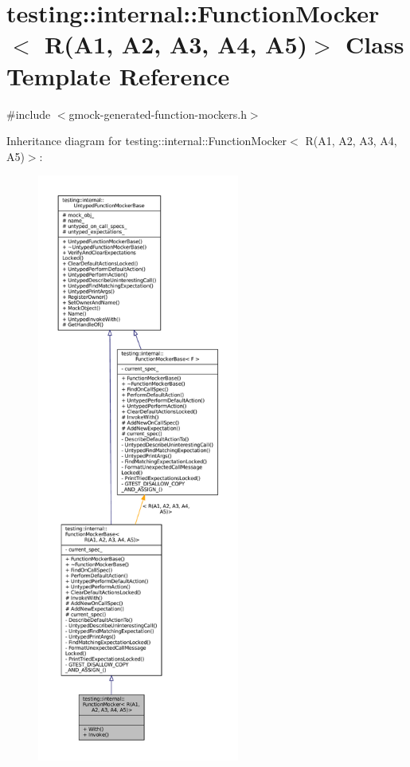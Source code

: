 \hypertarget{classtesting_1_1internal_1_1FunctionMocker_3_01R_07A1_00_01A2_00_01A3_00_01A4_00_01A5_08_4}{}\section{testing\+:\+:internal\+:\+:Function\+Mocker$<$ R(A1, A2, A3, A4, A5)$>$ Class Template Reference}
\label{classtesting_1_1internal_1_1FunctionMocker_3_01R_07A1_00_01A2_00_01A3_00_01A4_00_01A5_08_4}


{\ttfamily \#include $<$gmock-\/generated-\/function-\/mockers.\+h$>$}



Inheritance diagram for testing\+:\+:internal\+:\+:Function\+Mocker$<$ R(A1, A2, A3, A4, A5)$>$\+:
\nopagebreak
\begin{figure}[H]
\begin{center}
\leavevmode
\includegraphics[height=550pt]{classtesting_1_1internal_1_1FunctionMocker_3_01R_07A1_00_01A2_00_01A3_00_01A4_00_01A5_08_4__inherit__graph}
\end{center}
\end{figure}


